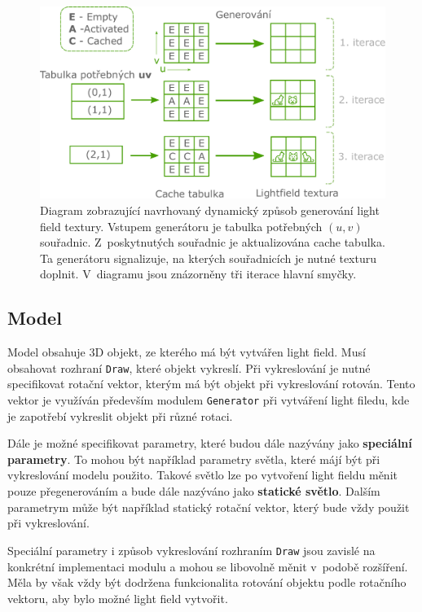 \begin{figure}[H]
	\centering
		\includegraphics[width=1.0\textwidth]{obrazky-figures/lfdiagram_fixed.pdf}
	\caption{Diagram zobrazující navrhovaný dynamický způsob generování light field textury. Vstupem generátoru je tabulka potřebných ${(u,v)}$ souřadnic. Z~poskytnutých souřadnic je aktualizována cache tabulka. Ta generátoru signalizuje, na kterých souřadnicích je nutné texturu doplnit. V~diagramu jsou znázorněny tři iterace hlavní smyčky.}
	\label{fig:lftabulka}
\end{figure}


\subsection*{Model} Model obsahuje 3D objekt, ze kterého má být vytvářen light field. Musí obsahovat rozhraní \texttt{Draw}, které objekt vykreslí. Při vykreslování je nutné specifikovat rotační vektor, kterým má být objekt při vykreslování rotován. Tento vektor je využíván především modulem \texttt{Generator} při vytváření light filedu, kde je zapotřebí vykreslit objekt při různé rotaci. 

Dále je možné specifikovat parametry, které budou dále nazývány jako \textbf{speciální parametry}. To mohou být například parametry světla, které májí být při vykreslování modelu použito. Takové světlo lze po vytvoření light fieldu měnit pouze přegenerováním a bude dále nazýváno jako \textbf{statické světlo}. Dalším parametrym může být například statický rotační vektor, který bude vždy použit při vykreslování. 

Speciální parametry i způsob vykreslování rozhraním \texttt{Draw} jsou zavislé na konkrétní implementaci modulu a mohou se libovolně měnit v~podobě rozšíření. Měla by však vždy být dodržena funkcionalita rotování objektu podle rotačního vektoru, aby bylo možné light field vytvořit. 

